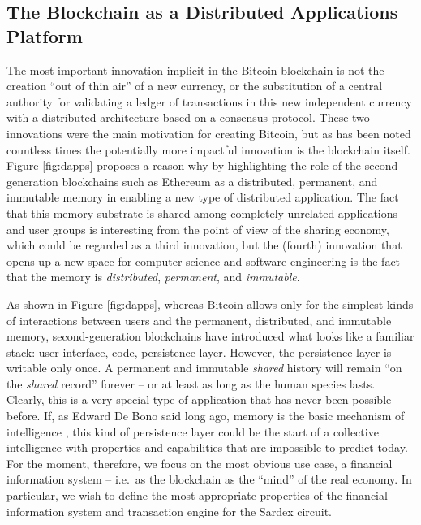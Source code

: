 \subsection{The Blockchain as a Distributed Applications Platform}
The most important innovation implicit in the Bitcoin blockchain is not the creation ``out of thin air'' of a new currency, or the substitution of a central authority for validating a ledger of transactions in this new independent currency with a distributed architecture based on a consensus protocol. These two innovations were the main motivation for creating Bitcoin, but as has been noted countless times the potentially more impactful innovation is the blockchain itself. Figure \ref{fig:dapps} proposes a reason why by highlighting the role of the second-generation blockchains such as Ethereum as a distributed, permanent, and immutable memory in enabling a new type of distributed application. The fact that this memory substrate is shared among completely unrelated applications and user groups is interesting from the point of view of the sharing economy, which could be regarded as a third innovation, but the (fourth) innovation that opens up a new space for computer science and software engineering is the fact that the memory is \emph{distributed}, \emph{permanent}, and \emph{immutable}.

As shown in Figure \ref{fig:dapps}, whereas Bitcoin allows only for the simplest kinds of interactions between users and the permanent, distributed, and immutable memory, second-generation blockchains have introduced what looks like a familiar stack: user interface, code, persistence layer. However, the persistence layer is writable only once. A permanent and immutable \emph{shared} history will remain ``on the \emph{shared} record'' forever -- or at least as long as the human species lasts. Clearly, this is a very special type of application that has never been possible before. If, as Edward De Bono said long ago, memory is the basic mechanism of intelligence \cite{DeBono1969}, this kind of persistence layer could be the start of a collective intelligence with properties and capabilities that are impossible to predict today. For the moment, therefore, we focus on the most obvious use case, a financial information system -- i.e.\ as the blockchain as the ``mind'' of the real economy. In particular, we wish to define the most appropriate properties of the financial information system and transaction engine for the Sardex circuit.

